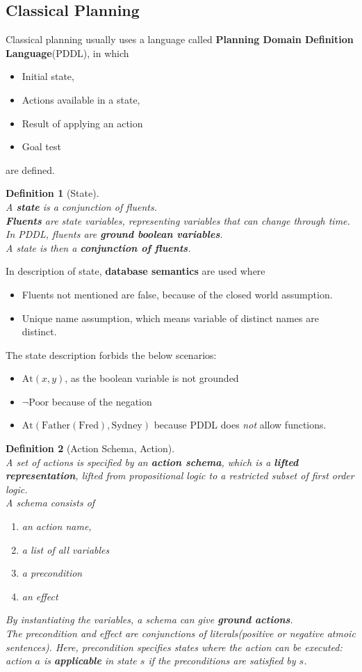 \documentclass[12pt]{article}
\newtheorem{definition}{Definition}[section]
\theoremstyle{definition}
\begin{document}
\subsection{Classical Planning}
Classical planning usually uses a language called \textbf{Planning Domain Definition Language}(PDDL), in which 
\begin{itemize}
	\item Initial state,
	\item Actions available in a state,
	\item Result of applying an action
	\item Goal test
\end{itemize}
are defined.
\begin{definition}[State]
\hfill\\\normalfont A \textbf{state} is a conjunction of fluents.\\
\textbf{Fluents} are state variables, representing variables that can change through time. In PDDL, fluents are \textbf{ground boolean variables}.\\
A state is then a \textbf{conjunction of fluents}.
\end{definition}
In description of state, \textbf{database semantics} are used where
\begin{itemize}
	\item Fluents not mentioned are false, because of the closed world assumption.
	\item Unique name assumption, which means variable of distinct names are distinct.
\end{itemize}
The state description forbids the below scenarios:
\begin{itemize}
	\item $\text{At}(x,y)$, as the boolean variable is not grounded
	\item $\neg\text{Poor}$ because of the negation
	\item $\text{At}(\text{Father}(\text{Fred}), \text{Sydney})$ because PDDL does \textit{not} allow functions.
\end{itemize}
\begin{definition}[Action Schema, Action]
\hfill\\\normalfont A set of actions is specified by an \textbf{action schema}, which is a \textbf{lifted representation}, lifted from propositional logic to a restricted subset of \textit{first order} logic.\\
A schema consists of 
\begin{enumerate}
\item an action name,
\item a list of all variables
\item a precondition
\item an effect
\end{enumerate} 
By instantiating the variables, a schema can give \textbf{ground actions}.\\
The precondition and effect are conjunctions of literals(positive or negative atmoic sentences). Here, precondition specifies states where the action can be executed: action $a$ is \textbf{applicable} in state $s$ if the preconditions are satisfied by $s$.
\end{definition}
\end{document}
